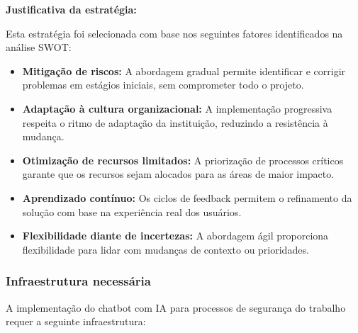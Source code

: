 \documentclass[12pt,a4paper]{article}
\begin{document}
\textbf{Justificativa da estratégia:}

Esta estratégia foi selecionada com base nos seguintes fatores identificados na análise SWOT:

\begin{itemize}
    \item \textbf{Mitigação de riscos:} A abordagem gradual permite identificar e corrigir problemas em estágios iniciais, sem comprometer todo o projeto.
    
    \item \textbf{Adaptação à cultura organizacional:} A implementação progressiva respeita o ritmo de adaptação da instituição, reduzindo a resistência à mudança.
    
    \item \textbf{Otimização de recursos limitados:} A priorização de processos críticos garante que os recursos sejam alocados para as áreas de maior impacto.
    
    \item \textbf{Aprendizado contínuo:} Os ciclos de feedback permitem o refinamento da solução com base na experiência real dos usuários.
    
    \item \textbf{Flexibilidade diante de incertezas:} A abordagem ágil proporciona flexibilidade para lidar com mudanças de contexto ou prioridades.
\end{itemize}

\subsubsection{Infraestrutura necessária}

A implementação do chatbot com IA para processos de segurança do trabalho requer a seguinte infraestrutura:
\end{document}
